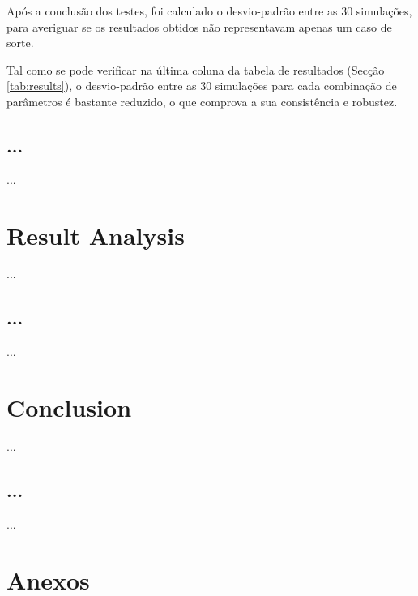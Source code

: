 \documentclass[a4paper]{article}
\begin{document}
Após a conclusão dos testes, foi calculado o desvio-padrão entre as 30 simulações,
para averiguar se os resultados obtidos não representavam apenas um caso de sorte.

Tal como se pode verificar na última coluna da tabela de resultados (Secção \ref{tab:results}), o desvio-padrão entre as 30 simulações para cada combinação de parâmetros
é bastante reduzido, o que comprova a sua consistência e robustez.

\cleardoublepage

\subsection{...}
\indent \indent ...

\cleardoublepage

\section{Result Analysis}
\indent \indent ...

\cleardoublepage

\subsection{...}
\indent \indent ...

\cleardoublepage
\section{Conclusion}
\indent \indent ...

\cleardoublepage

\subsection{...}
\indent \indent ...

\eject \pdfpagewidth=594.0mm \pdfpageheight=420.0mm

\cleardoublepage
\section{Anexos}
\end{document}
